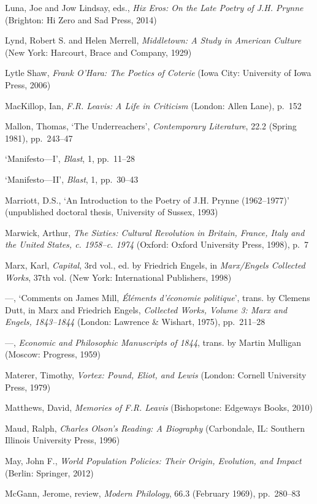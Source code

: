 \documentclass[]{article}
\begin{document}
Luna, Joe and Jow Lindsay, eds., \emph{Hix Eros: On the Late Poetry of
J.H. Prynne} (Brighton: Hi Zero and Sad Press, 2014)

Lynd, Robert S. and Helen Merrell, \emph{Middletown: A Study in American
Culture} (New York: Harcourt, Brace and Company, 1929)

Lytle Shaw, \emph{Frank O’Hara: The Poetics of Coterie} (Iowa City:
University of Iowa Press, 2006)

MacKillop, Ian, \emph{F.R. Leavis: A Life in Criticism} (London: Allen
Lane), p.~152

Mallon, Thomas, ‘The Underreachers’, \emph{Contemporary Literature},
22.2 (Spring 1981), pp.~243–47

‘Manifesto—I’, \emph{Blast}, 1, pp.~11–28

‘Manifesto—II’, \emph{Blast}, 1, pp.~30–43

Marriott, D.S., ‘An Introduction to the Poetry of J.H. Prynne
(1962–1977)’ (unpublished doctoral thesis, University of Sussex, 1993)

Marwick, Arthur, \emph{The Sixties: Cultural Revolution in Britain,
France, Italy and the United States, c. 1958–c. 1974} (Oxford: Oxford
University Press, 1998), p.~7

Marx, Karl, \emph{Capital}, 3rd vol., ed. by Friedrich Engels, in
\emph{Marx/Engels Collected Works}, 37th vol. (New York: International
Publishers, 1998)

—, ‘Comments on James Mill, \emph{Éléments d’économie politique}’,
trans. by Clemens Dutt, in Marx and Friedrich Engels, \emph{Collected
Works, Volume 3: Marx and Engels, 1843–1844} (London: Lawrence \&
Wishart, 1975), pp.~211–28

—, \emph{Economic and Philosophic Manuscripts of 1844}, trans. by Martin
Mulligan (Moscow: Progress, 1959)

Materer, Timothy, \emph{Vortex: Pound, Eliot, and Lewis} (London:
Cornell University Press, 1979)

Matthews, David, \emph{Memories of F.R. Leavis} (Bishopstone: Edgeways
Books, 2010)

Maud, Ralph, \emph{Charles Olson’s Reading: A Biography} (Carbondale,
IL: Southern Illinois University Press, 1996)

May, John F., \emph{World Population Policies: Their Origin, Evolution,
and Impact} (Berlin: Springer, 2012)

McGann, Jerome, review, \emph{Modern Philology}, 66.3 (February 1969),
pp.~280–83
\end{document}
